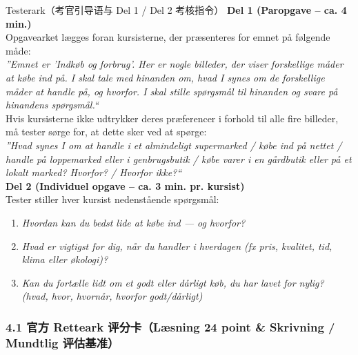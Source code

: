 \begin{emailbox}{Testerark（考官引导语与 Del 1 / Del 2 考核指令）}
\small
\textbf{\color{NCDNavy}Del 1 (Paropgave -- ca. 4 min.)}\\
Opgavearket lægges foran kursisterne, der præsenteres for emnet på følgende måde:\\[2pt]
\textit{”Emnet er ’Indkøb og forbrug’. Her er nogle billeder, der viser forskellige måder at købe ind på. I skal tale med hinanden om, hvad I synes om de forskellige måder at handle på, og hvorfor. I skal stille spørgsmål til hinanden og svare på hinandens spørgsmål.“}\\[4pt]
Hvis kursisterne ikke udtrykker deres præferencer i forhold til alle fire billeder, må tester sørge for, at dette sker ved at spørge:\\[2pt]
\textit{”Hvad synes I om at handle i et almindeligt supermarked / købe ind på nettet / handle på loppemarked eller i genbrugsbutik / købe varer i en gårdbutik eller på et lokalt marked? Hvorfor? / Hvorfor ikke?“}\\[6pt]
\textbf{\color{NCDNavy}Del 2 (Individuel opgave -- ca. 3 min. pr. kursist)}\\
Tester stiller hver kursist nedenstående spørgsmål:
\begin{enumerate}
  \item \textit{Hvordan kan du bedst lide at købe ind --- og hvorfor?}
  \item \textit{Hvad er vigtigst for dig, når du handler i hverdagen (fx pris, kvalitet, tid, klima eller økologi)?}
  \item \textit{Kan du fortælle lidt om et godt eller dårligt køb, du har lavet for nylig? (hvad, hvor, hvornår, hvorfor godt/dårligt)}
\end{enumerate}
\end{emailbox}


\subsubsection*{4.1 官方 Retteark 评分卡（Læsning 24 point \& Skrivning / Mundtlig 评估基准）}


